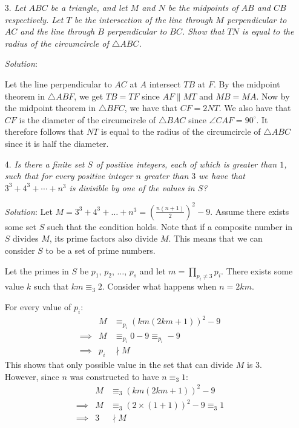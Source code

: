 \documentclass{article}
\begin{document}
\begin{enumerate}
\item[3.] %
\textit{Let $ABC$ be a triangle, and let $M$ and $N$ be the midpoints of $AB$ and $CB$ respectively.
Let $T$ be the intersection of the line through $M$ perpendicular to $AC$ and the line through $B$ perpendicular to $BC$.
Show that $TN$ is equal to the radius of the circumcircle of $\triangle ABC$.}

\textit{Solution}:

Let the line perpendicular to $AC$ at $A$ intersect $TB$ at $F$.
By the midpoint theorem in $\triangle ABF$, we get $TB=TF$ since $AF\parallel MT$ and $MB=MA$.
Now by the midpoint theorem in $\triangle BFC$, we have that $CF=2NT$.
We also have that $CF$ is the diameter of the circumcircle of $\triangle BAC$ since $\angle CAF=90^\circ$.
It therefore follows that $NT$ is equal to the radius of the circumcircle of $\triangle ABC$ since it is half the diameter.


\item[4.] %
\textit{Is there a finite set $S$ of positive integers, each of which is greater than $1$, such that for every positive integer $n$ greater than $3$ we have that $3^3 +4^3 +\dotsb +n^3$ is divisible by one of the values in $S$?}

\textit{Solution}:
Let $M = 3^3 + 4^3 + \dots + n^3 = \left(\frac{n(n + 1)}{2}\right)^2 - 9$.
Assume there exists some set $S$ such that the condition holds.
Note that if a composite number in $S$ divides $M$, its prime factors also divide $M$.
This means that we can consider $S$ to be a set of prime numbers.

Let the primes in $S$ be $p_1$, $p_2$, $\dots$, $p_s$ and let $m = \prod_{p_i \neq 3}p_i$.
There exists some value $k$ such that $km \equiv _3 2$.
Consider what happens when $n = 2km$.

For every value of $p_i$:
\begin{align*}
  && M &\equiv _{p_i} (km(2km + 1))^2 - 9 \\
  &\implies& M &\equiv _{p_i} 0 - 9 \equiv_{p_i} -9 \\
  &\implies& p_i &\nmid M &
\end{align*}
This shows that only possible value in the set that can divide $M$ is $3$.
However, since $n$ was constructed to have $n \equiv _3 1$:
\begin{align*}
  &&M &\equiv _3 (km(2km + 1))^2 - 9 \\
  &\implies& M &\equiv _3 (2 \times (1 + 1))^2 - 9 \equiv_3 1\\
  &\implies& 3 &\nmid M &
\end{align*}


\end{enumerate}
\end{document}
